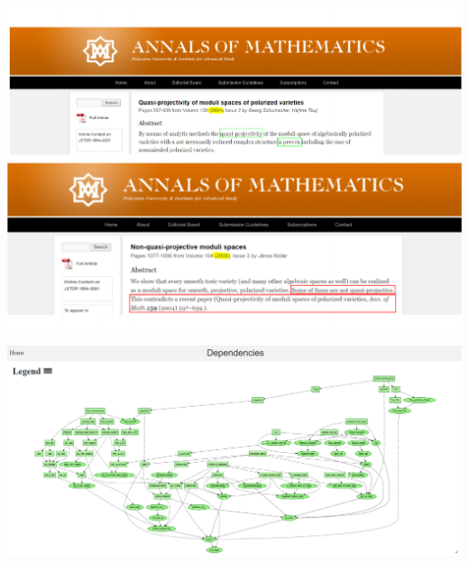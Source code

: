 \documentclass[10pt]{beamer}
\begin{document}
\begin{frame}
\includegraphics[trim=1.3cm 0 0 1cm, scale = .4]{Annals_Flattened.pdf}
\end{frame}
\begin{frame}
\centering
\includegraphics[scale = .225]{LTE_Blueprint.png}
\end{frame}
\end{document}
